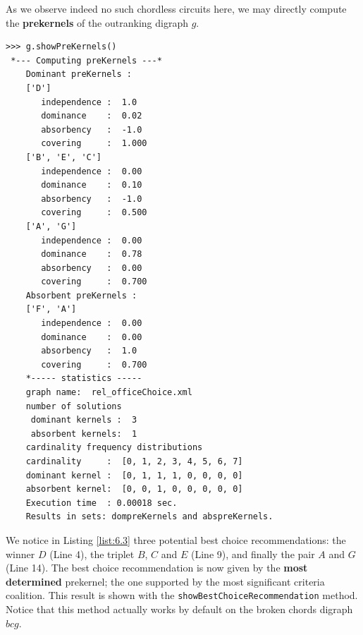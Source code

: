 As we observe indeed no such chordless circuits here, we may directly compute the \textbf{prekernels} of the outranking digraph $g$.

\begin{lstlisting}[caption={Computing outranking and outranked prekernels},label=list:6.3]
>>> g.showPreKernels()
 *--- Computing preKernels ---*
    Dominant preKernels :
    ['D']
       independence :  1.0
       dominance    :  0.02
       absorbency   :  -1.0
       covering     :  1.000
    ['B', 'E', 'C']
       independence :  0.00
       dominance    :  0.10
       absorbency   :  -1.0
       covering     :  0.500
    ['A', 'G']
       independence :  0.00
       dominance    :  0.78
       absorbency   :  0.00
       covering     :  0.700
    Absorbent preKernels :
    ['F', 'A']
       independence :  0.00
       dominance    :  0.00
       absorbency   :  1.0
       covering     :  0.700
    *----- statistics -----
    graph name:  rel_officeChoice.xml
    number of solutions
     dominant kernels :  3
     absorbent kernels:  1
    cardinality frequency distributions
    cardinality     :  [0, 1, 2, 3, 4, 5, 6, 7]
    dominant kernel :  [0, 1, 1, 1, 0, 0, 0, 0]
    absorbent kernel:  [0, 0, 1, 0, 0, 0, 0, 0]
    Execution time  : 0.00018 sec.
    Results in sets: dompreKernels and abspreKernels.
\end{lstlisting}
  
We notice in Listing \ref{list:6.3} three potential best choice recommendations: the \Condorcet winner $D$ (Line 4), the triplet $B$, $C$ and $E$ (Line 9), and finally the pair $A$ and $G$ (Line 14). The best choice recommendation is now given by the \textbf{most determined} prekernel; the one supported by the most significant criteria coalition. This result is shown with the \texttt{showBestChoiceRecommendation} method. Notice that this method actually works by default on the broken chords digraph $bcg$.

